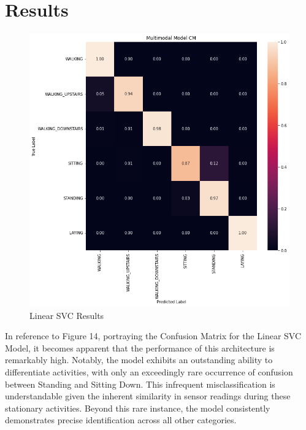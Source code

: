 \documentclass[conference]{IEEEtran}
\begin{document}
\section{Results}
\begin{figure}[h!]
	\includegraphics[width= 0.9 \linewidth]{linearSVC.png}
	\centering
	\caption{Linear SVC Results}
	\label{linearSVC.png}
\end{figure}
In reference to Figure 14, portraying the Confusion Matrix for the Linear SVC Model, it becomes apparent that the performance of this architecture is remarkably high. Notably, the model exhibits an outstanding ability to differentiate activities, with only an exceedingly rare occurrence of confusion between Standing and Sitting Down. This infrequent misclassification is understandable given the inherent similarity in sensor readings during these stationary activities. Beyond this rare instance, the model consistently demonstrates precise identification across all other categories.
\end{document}
